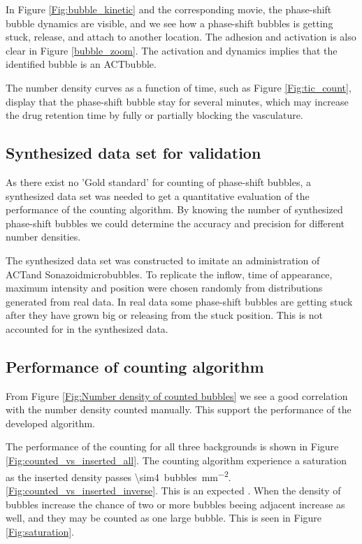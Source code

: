In Figure \ref{Fig:bubble_kinetic} and the corresponding movie, the phase-shift bubble dynamics are visible, and we see how a phase-shift bubbles is getting stuck, release, and attach to another location. The adhesion and activation is also clear in Figure \ref{bubble_zoom}. The activation and dynamics implies that the identified bubble is an ACT\texttrademark bubble.

The number density curves as a function of time, such as Figure \ref{Fig:tic_count}, display that the phase-shift bubble stay for several minutes, which may increase the drug retention time by fully or partially blocking the vasculature.

\subsection{Synthesized data set for validation}
As there exist no 'Gold standard' for counting of phase-shift bubbles, a synthesized data set was needed to get a quantitative evaluation of the performance of the counting algorithm. By knowing the number of synthesized phase-shift bubbles we could determine the accuracy and precision for different number densities.

The synthesized data set was constructed to imitate an administration of ACT\texttrademark and Sonazoid\texttrademark microbubbles. To replicate the inflow, time of appearance, maximum intensity and position were chosen randomly from distributions generated from real data. In real data some phase-shift bubbles are getting stuck after they have grown big or releasing from the stuck position. This is not accounted for in the synthesized data. 

\subsection{Performance of counting algorithm}
From Figure \ref{Fig:Number density of counted bubbles} we see a good correlation with the number density counted manually. This support the performance of the developed algorithm.

The performance of the counting for all three backgrounds is shown in Figure \ref{Fig:counted_vs_inserted_all}. The counting algorithm experience a saturation as the inserted density passes 	\SI{\sim4}{bubbles\per\milli\meter\squared}. \ref{Fig:counted_vs_inserted_inverse}. This is an expected \texttrademark. When the density of bubbles increase the chance of two or more bubbles beeing adjacent increase as well, and they may be counted as one large bubble. This is seen in Figure \ref{Fig:saturation}. 

